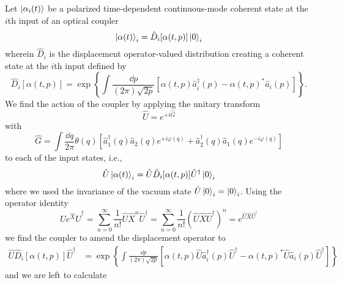 Let $\ket{\alpha_i(t)}$ be a polarized time-dependent continuous-mode coherent state at the $i$th input of an optical coupler
\begin{equation}
	\ket{\alpha(t)}_i
	=
	\hat{D}_i[\alpha(t,p)]
	\ket{0}_i
\end{equation}
wherein $\hat{D}_i$ is the displacement operator-valued distribution creating a coherent state at the $i$th input defined by
\begin{equation}
	\hat{D}_i[\alpha(t,p)]
	=
	\exp\left\{
		\int\frac{\dd{p}}{(2\pi)\sqrt{2p}}
		\left[
			\alpha(t,p)
			\hat{a}_i^\dagger(p)
			-
			\alpha(t,p)^*
			\hat{a}_i(p)
		\right]
	\right\}
	.
\end{equation}
We find the action of the coupler by applying the unitary transform
\begin{equation}
	\hat{U}
	=
	e^{+i\hat{G}}
\end{equation}
with
\begin{equation}
	\hat{G}
	=
	\int\frac{\dd{q}}{2\pi}
	\theta(q)
	\left[
		\hat{a}_1^\dagger(q)
		\hat{a}_2(q)
		e^{+i\varphi(q)}
		+
		\hat{a}_2^\dagger(q)
		\hat{a}_1(q)
		e^{-i\varphi(q)}
	\right]
\end{equation}
to each of the input states, i.e.,
\begin{equation}
	\hat{U}
	\ket{\alpha(t)}_i
	=
	\hat{U}
	\hat{D}_i[\alpha(t,p)]
	\hat{U}^\dagger
	\ket{0}_i
\end{equation}
where we used the invariance of the vacuum state $\hat{U}\ket{0}_i=\ket{0}_i$.
Using the operator identity
\begin{equation}
	\hat{U}
	e^{\hat{X}}
	\hat{U}^\dagger
	=
	\sum_{n=0}^\infty
	\frac{1}{n!}
	\hat{U}
	\hat{X}^n
	\hat{U}^\dagger
	=
	\sum_{n=0}^\infty
	\frac{1}{n!}
	\left(
		\hat{U}
		\hat{X}
		\hat{U}^\dagger
	\right)^n
	=
	e^{\hat{U}\hat{X}\hat{U}^\dagger}
\end{equation}
we find the coupler to amend the displacement operator to
\begin{equation}
	\begin{split}
		\hat{U}
		\hat{D}_i[\alpha(t,p)]
		\hat{U}^\dagger
		&=
		\exp\left\{
			\int\frac{\dd{p}}{(2\pi)\sqrt{2p}}
			\left[
				\alpha(t,p)
				\hat{U}
				\hat{a}_i^\dagger(p)
				\hat{U}^\dagger
				-
				\alpha(t,p)^*
				\hat{U}
				\hat{a}_i(p)
				\hat{U}^\dagger
			\right]
		\right\}
	\end{split}
\end{equation}
and we are left to calculate
